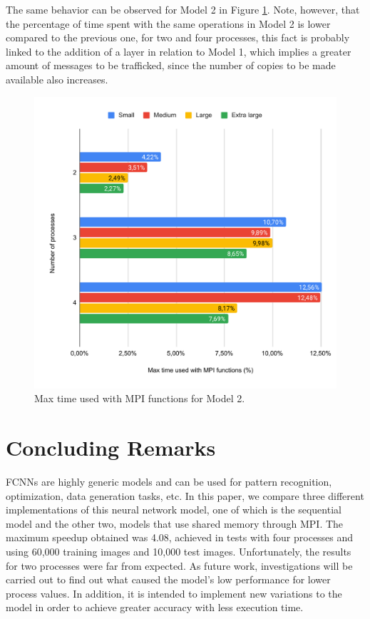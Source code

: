 \documentclass[conference]{IEEEtran}
\begin{document}
The same behavior can be observed for Model 2 in Figure \ref{fig:mpimaxtime2}. Note, however, that the percentage of time spent with the same operations in Model 2 is lower compared to the previous one, for two and four processes, this fact is probably linked to the addition of a layer in relation to Model 1, which implies a greater amount of messages to be trafficked, since the number of copies to be made available also increases.

\begin{figure}
    \centering
    \includegraphics[width=\columnwidth]{images/mpi-max-time-m2.pdf}
    \caption{Max time used with MPI functions for Model 2.}
    \label{fig:mpimaxtime2}
\end{figure}

\section{Concluding Remarks}
FCNNs are highly generic models and can be used for pattern recognition, optimization, data generation tasks, etc. In this paper, we compare three different implementations of this neural network model, one of which is the sequential model and the other two, models that use shared memory through MPI. The maximum speedup obtained was 4.08, achieved in tests with four processes and using 60,000 training images and 10,000 test images. Unfortunately, the results for two processes were far from expected. As future work, investigations will be carried out to find out what caused the model's low performance for lower process values. In addition, it is intended to implement new variations to the model in order to achieve greater accuracy with less execution time.


\end{document}

